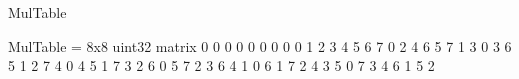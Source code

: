     \begin{matlabcode}
    MulTable
    \end{matlabcode}
    \begin{matlaboutput}
    MulTable = 8x8 uint32 matrix    
       0   0   0   0   0   0   0   0
       0   1   2   3   4   5   6   7
       0   2   4   6   5   7   1   3
       0   3   6   5   1   2   7   4
       0   4   5   1   7   3   2   6
       0   5   7   2   3   6   4   1
       0   6   1   7   2   4   3   5
       0   7   3   4   6   1   5   2
    
    \end{matlaboutput}
    \pagebreak